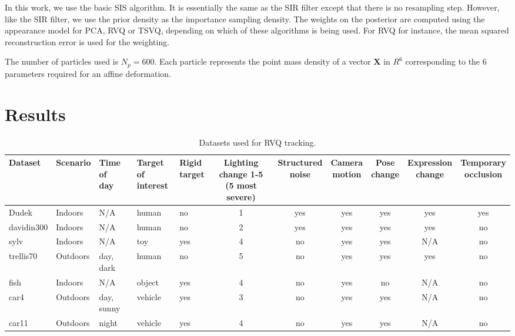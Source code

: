 In this work, we use the basic SIS algorithm.  It is essentially the same as the SIR filter except that there is no resampling step.  However, like the SIR filter, we use the prior density as the importance sampling density.  The weights on the posterior are computed using the appearance model for PCA, RVQ or TSVQ, depending on which of these algorithms is being used.  For RVQ for instance, the mean squared reconstruction error is used for the weighting.

The number of particles used is $N_p=600$.  Each particle represents the point mass density of a vector $\mathbf{X}$ in $R^6$ corresponding to the 6 parameters required for an affine deformation.

\cite{1992_JNL_MCMC_Carlin}








\section{Results}
\begin{table}[t]
\footnotesize
\begin{tabular}{p{0.6in}|p{0.6in}p{0.6in}p{0.4in}p{0.4in}cccccc}
Dataset 		&Scenario	     &\parbox[c]{0.4in}{\center Time of \\day} 	&\parbox[c]{0.26in}{\center Target of \\interest}  &\parbox{0.3in}{\center Rigid \\target} 	&\parbox{0.4in}{\center Lighting change 1-5 \\(5 most severe)}  	&\parbox{0.5in}{\center Structured \\noise} 	&\parbox{0.4in}{\center Camera \\motion} 	&\parbox{0.3in}{\center Pose \\change} 	&\parbox{0.45in}{\center Expression \\change} 	&\parbox{0.3in}{\center Temporary \\occlusion} 	\\\hline
Dudek 			&Indoors 	     &N/A 			&human 					&no 	&1 	&yes 	&yes 	&yes 	&yes 	&yes 		\\\hline
davidin300 	&Indoors		&N/A			&human					&no	&2	&yes	&yes	&yes	&yes	&no		\\\hline
sylv				&Indoors		&N/A			&toy						&yes	&4	&no	&yes	&yes	&N/A	&no		\\\hline
trellis70	 		&Outdoors 		&day, dark		&human					&no	&5	&no	&yes	&yes	&yes	&no		\\\hline
fish				&Indoors		&N/A			&object					&yes	&4	&no	&yes	&no	&N/A	&no		\\\hline
car4			&Outdoors 		&day, sunny	&vehicle					&yes	&3	&no	&yes	&yes	&N/A	&no		\\\hline
car11			&Outdoors		&night			&vehicle					&yes	&4	&no	&yes	&yes	&N/A	&no		\\\hline
\end{tabular}
\caption{Datasets used for RVQ tracking.}
\label{Tab:datasets_used}
\end{table}



